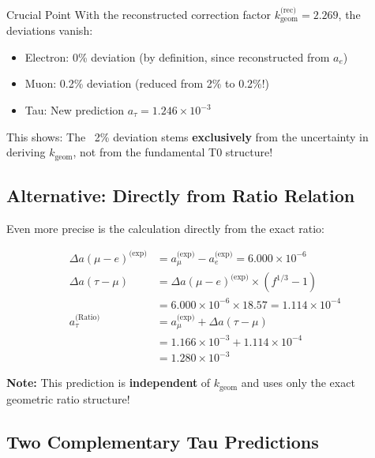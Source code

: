 	\begin{important}{Crucial Point}
		With the reconstructed correction factor $k_{\text{geom}}^{\text{(rec)}} = 2.269$, the deviations vanish:
		\begin{itemize}
			\item Electron: 0\% deviation (by definition, since reconstructed from $a_e$)
			\item Muon: 0.2\% deviation (reduced from 2\% to 0.2\%!)
			\item Tau: New prediction $a_\tau = 1.246 \times 10^{-3}$
		\end{itemize}
		
		This shows: The ~2\% deviation stems \textbf{exclusively} from the uncertainty in deriving $k_{\text{geom}}$, not from the fundamental T0 structure!
	\end{important}
	
	\subsection{Alternative: Directly from Ratio Relation}
	
	Even more precise is the calculation directly from the exact ratio:
	
	\begin{align}
		\Delta a(\mu-e)^{\text{(exp)}} &= a_\mu^{\text{(exp)}} - a_e^{\text{(exp)}} = 6.000 \times 10^{-6} \\
		\Delta a(\tau-\mu) &= \Delta a(\mu-e)^{\text{(exp)}} \times (f^{1/3} - 1) \\
		&= 6.000 \times 10^{-6} \times 18.57 = 1.114 \times 10^{-4} \\
		a_\tau^{\text{(Ratio)}} &= a_\mu^{\text{(exp)}} + \Delta a(\tau-\mu) \\
		&= 1.166 \times 10^{-3} + 1.114 \times 10^{-4} \\
		&= \boxed{1.280 \times 10^{-3}}
	\end{align}
	
	\textbf{Note:} This prediction is \textbf{independent} of $k_{\text{geom}}$ and uses only the exact geometric ratio structure!
	
	\subsection{Two Complementary Tau Predictions}
	
